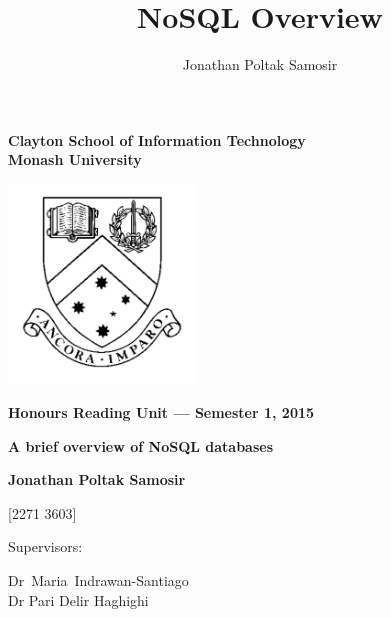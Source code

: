\thispagestyle{empty} %
\renewcommand{\thepage}{\roman{page}}

\author{Jonathan Poltak Samosir}
\title{NoSQL Overview}

\begin{spacing}{1.5}
\begin{center}
{\Large \bfseries
Clayton School of Information Technology\\
Monash University}

\vspace*{30mm}

\includegraphics[width=5cm]{img/MonashCrest.pdf}

\vspace*{10mm}

{\large \bfseries
Honours Reading Unit --- Semester 1, 2015
}

\vspace*{5mm}

{\LARGE \bfseries
A brief overview of NoSQL databases
}

\vspace*{10mm}

{\large \bfseries
Jonathan Poltak Samosir

[2271 3603]

\vspace*{20mm}

Supervisors: \parbox[t]{50mm}{\mbox{Dr Maria Indrawan-Santiago}\\Dr Pari Delir Haghighi}
}

\end{center}
\end{spacing}

\newpage


\tableofcontents

\newpage
\setcounter{page}{1}
\renewcommand{\thepage}{\arabic{page}}
